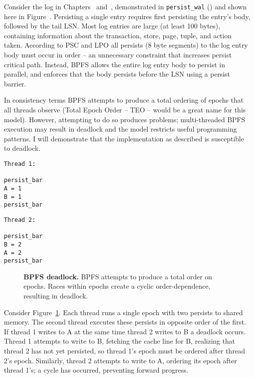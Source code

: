 

Consider the log in Chapters~ and~, demonstrated in \texttt{persist\_wal} () and shown here in Figure~.
Persisting a single entry requires first persisting the entry's body, followed by the tail LSN.
Most log entries are large (at least 100 bytes), containing information about the transaction, store, page, tuple, and action taken.
According to PSC and LPO all persists (8 byte segments) to the log entry body must occur in order -- an unnecessary constraint that increases persist critical path.
Instead, BPFS allows the entire log entry body to persist in parallel, and enforces that the body persists before the LSN using a persist barrier.

In consistency terms BPFS attempts to produce a total ordering of epochs that all threads observe (Total Epoch Order -- TEO -- would be a great name for this model).
However, attempting to do so produces problems; multi-threaded BPFS execution may result in deadlock and the model restricts useful programming patterns.
I will demonstrate that the implementation as described is susceptible to deadlock.

{
\singlespacing
\newsavebox{\ThreadOne}
\begin{lrbox}{\ThreadOne}
  \begin{lstlisting}
Thread 1:

persist_bar
A = 1
B = 1
persist_bar
  \end{lstlisting}
\end{lrbox}

\newsavebox{\ThreadTwo}
\begin{lrbox}{\ThreadTwo}
  \begin{lstlisting}
Thread 2:

persist_bar
B = 2
A = 2
persist_bar
  \end{lstlisting}
\end{lrbox}

\begin{figure}[]
\centering
\subfigure{ \usebox{\ThreadOne} }
\hspace{1 in}
\subfigure{ \usebox{\ThreadTwo} }
\caption{\textbf{BPFS deadlock.} BPFS attempts to produce a total order on epochs.  Races within epochs create a cyclic order-dependence, resulting in deadlock.}
\label{fig:BPFS_deadlock}
\end{figure}
}

Consider Figure~\ref{fig:BPFS_deadlock}.
Each thread runs a single epoch with two persists to shared memory.
The second thread executes these persists in opposite order of the first.
If thread 1 writes to A at the same time thread 2 writes to B a deadlock occurs.
Thread 1 attempts to write to B, fetching the cache line for B, realizing that thread 2 has not yet persisted, so thread 1's epoch must be ordered after thread 2's epoch.
Similarly, thread 2 attempts to write to A, ordering its epoch after thread 1's; a cycle has occurred, preventing forward progress.

